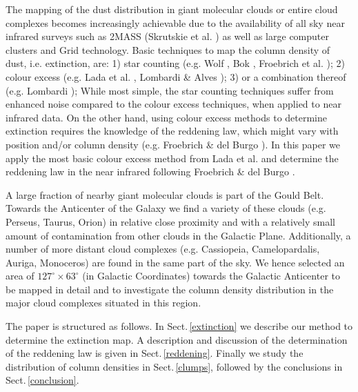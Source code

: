 \documentclass[useAMS,usenatbib]{mn2e}
\begin{document}
The mapping of the dust distribution in giant molecular clouds or entire cloud
complexes becomes increasingly achievable due to the availability of all sky
near infrared surveys such as 2MASS (Skrutskie et al.
\cite{2006AJ....131.1163S}) as well as large computer clusters and Grid
technology. Basic techniques to map the column density of dust, i.e. extinction,
are: 1) star counting (e.g. Wolf \cite{1923AN....219..109W}, Bok 
\cite{1956AJ.....61..309B}, Froebrich et al. \cite{2005A&A...432L..67F}); 2)
colour excess (e.g. Lada et al. \cite{1994ApJ...429..694L}, Lombardi \& Alves
\cite{2001A&A...377.1023L}); 3) or a combination thereof (e.g. Lombardi
\cite{2005A&A...438..169L}); While most simple, the star counting techniques
suffer from enhanced noise compared to the colour excess techniques, when
applied to near infrared data. On the other hand, using colour excess methods to
determine extinction requires the knowledge of the reddening law, which might
vary with position and/or column density (e.g. Froebrich \& del Burgo
\cite{2006MNRAS.369.1901F}). In this paper we apply the most basic colour excess
method from Lada et al. \cite{1994ApJ...429..694L} and determine the reddening
law in the near infrared following Froebrich \& del Burgo
\cite{2006MNRAS.369.1901F}.

A large fraction of nearby giant molecular clouds is part of the Gould Belt.
Towards the Anticenter of the Galaxy we find a variety of these clouds (e.g.
Perseus, Taurus, Orion) in relative close proximity and with a relatively small
amount of contamination from other clouds in the Galactic Plane. Additionally, a
number of more distant cloud complexes (e.g. Cassiopeia, Camelopardalis, Auriga,
Monoceros) are found in the same part of the sky. We hence selected an area of
$127^\circ \times 63^\circ$ (in Galactic Coordinates) towards the Galactic
Anticenter to be mapped in detail and to investigate the column density
distribution in the major cloud complexes situated in this region.

The paper is structured as follows. In Sect.\,\ref{extinction} we describe our
method to determine the extinction map. A description and discussion of the
determination of the reddening law is given in Sect.\,\ref{reddening}. Finally
we study the distribution of column densities in Sect.\,\ref{clumps}, followed
by the conclusions in Sect.\,\ref{conclusion}.
\end{document}
